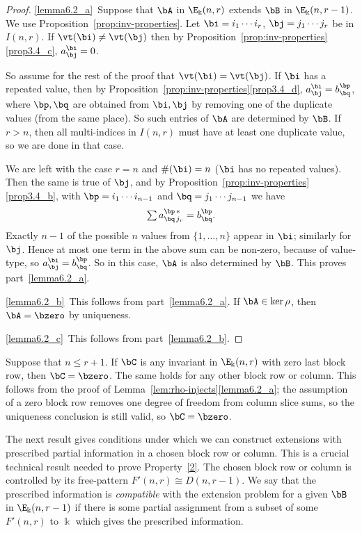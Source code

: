 \begin{proof}
\ref{lemma6.2_a}~Suppose that $\bA$ in $\E_\Bbbk(n,r)$ extends $\bB$ in
 $\E_\Bbbk(n,r-1)$. We use Proposition~\ref{prop:inv-properties}. Let
 $\bi = i_1 \cdots i_r$, $\bj = j_1 \cdots j_r$ be in $I(n,r)$. If
 $\vt(\bi) \ne \vt(\bj)$ then by Proposition~\ref{prop:inv-properties}\ref{prop3.4_c}, $a^\bi_\bj = 0$.

\goodbreak
 So assume for the rest of the proof that $\vt(\bi) = \vt(\bj)$. If
 $\bi$ has a repeated value, then by Proposition~\ref{prop:inv-properties}\ref{prop3.4_d}, $a^\bi_\bj = b^\bp_\bq$, where $\bp,
 \bq$ are obtained from $\bi, \bj$ by removing one of the duplicate
 values (from the same place). So such entries of $\bA$ are
 determined by $\bB$. If $r>n$, then all multi-indices in $I(n,r)$
 must have at least one duplicate value, so we are done in that case.

 We are left with the case $r=n$ and $\#(\bi) = n$ ($\bi$ has no
 repeated values). Then the same is true of $\bj$, and by Proposition~\ref{prop:inv-properties}\ref{prop3.4_b}, with $\bp = i_1 \cdots i_{n-1}$ and
 $\bq = j_1 \cdots j_{n-1}$ we have
 \[
 \textstyle \sum a^{\bp\,*}_{\bq\,j_r} = b^\bp_\bq .
 \]
 Exactly $n-1$ of the possible $n$ values from $\{1, \dots, n\}$
 appear in $\bi$; similarly for $\bj$. Hence at most one term in the
 above sum can be non-zero, because of value-type, so $a^\bi_\bj =
 b^\bp_\bq$. So in this case, $\bA$ is also determined by $\bB$. This
 proves part~\ref{lemma6.2_a}.

\ref{lemma6.2_b}~This follows from part~\ref{lemma6.2_a}. If $\bA \in \ker \rho$, then $\bA =
 \bzero$ by uniqueness.

\ref{lemma6.2_c}~This follows from part~\ref{lemma6.2_b}.
\end{proof}

\begin{rema}\label{rmk:sharper}
 Suppose that $n \le r+1$. If $\bC$ is any invariant in
 $\E_\Bbbk(n,r)$ with zero last block row, then $\bC = \bzero$. The
 same holds for any other block row or column. This follows from the
 proof of Lemma~\ref{lem:rho-injects}\ref{lemma6.2_a}; the assumption of a zero
 block row removes one degree of freedom from column slice sums, so
 the uniqueness conclusion is still valid, so $\bC=\bzero$.
\end{rema}

The next result gives conditions under which we can construct
extensions with prescribed partial information in a chosen block row
or column. This is a crucial technical result needed to prove
Property~\ref{2}. The chosen block row or column is controlled by its
free-pattern $F'(n,r) \cong D(n,r-1)$. We say that the prescribed
information is \emph{compatible} with the extension problem for a
given $\bB$ in $\E_\Bbbk(n,r-1)$ if there is some partial assignment
from a subset of some $F'(n,r)$ to $\Bbbk$ which gives the prescribed
information.



